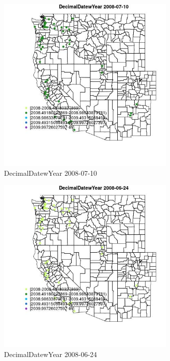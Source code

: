 \begin{figure} 
\centering  
\includegraphics[width=0.77\textwidth]{Code_Outputs/Report_ML_input_PM25_Step4_part_e_de_duplicated_aves_MapObsDecimalDatewYear2008-07-10.jpg} 
\caption{\label{fig:Report_ML_input_PM25_Step4_part_e_de_duplicated_avesMapObsDecimalDatewYear2008-07-10}DecimalDatewYear 2008-07-10} 
\end{figure} 
 

\begin{figure} 
\centering  
\includegraphics[width=0.77\textwidth]{Code_Outputs/Report_ML_input_PM25_Step4_part_e_de_duplicated_aves_MapObsDecimalDatewYear2008-06-24.jpg} 
\caption{\label{fig:Report_ML_input_PM25_Step4_part_e_de_duplicated_avesMapObsDecimalDatewYear2008-06-24}DecimalDatewYear 2008-06-24} 
\end{figure} 
 

